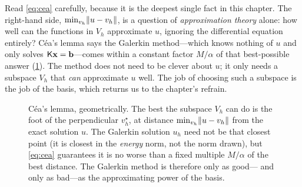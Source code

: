 Read \cref{eq:cea} carefully, because it is the deepest single fact in this
chapter. The right-hand side, $\min_{v_h}\lVert u-v_h\rVert$, is a question of
\emph{approximation theory} alone: how well can the functions in $V_h$ approximate
$u$, ignoring the differential equation entirely? Céa's lemma says the Galerkin
method---which knows nothing of $u$ and only solves $\mathsf{K}\mathbf{x}=\mathbf{b}$---comes
within a constant factor $M/\alpha$ of that best-possible answer
(\cref{fig:cea}). The method does not need to be clever about $u$; it only needs a
subspace $V_h$ that \emph{can} approximate $u$ well. The job of choosing such a
subspace is the job of the basis, which returns us to the chapter's refrain.

\begin{figure}[t]
\centering
{}
\caption[Céa's quasi-optimality]{Céa's lemma, geometrically. The best the
subspace $V_h$ can do is the foot of the perpendicular $v_h^\star$, at distance
$\min_{v_h}\lVert u-v_h\rVert$ from the exact solution $u$. The Galerkin solution $u_h$
need not be that closest point (it is closest in the \emph{energy} norm, not the
norm drawn), but \cref{eq:cea} guarantees it is no worse than a fixed multiple
$M/\alpha$ of the best distance. The Galerkin method is therefore only as good---
and only as bad---as the approximating power of the basis.}
\label{fig:cea}
\end{figure}

